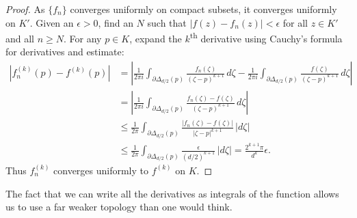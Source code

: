 \documentclass[12pt,openany]{book}
\newcommand{\sabs}[1]{\lvert {#1} \rvert}
\newcommand{\abs}[1]{\left\lvert {#1} \right\rvert}
\theoremstyle{plain}
\theoremstyle{remark}
\theoremstyle{definition}
\theoremstyle{exercise}
\theoremstyle{example}
\begin{document}
\begin{proof}
As $\{ f_n \}$ converges uniformly on compact subsets, it converges uniformly
on $K'$.  Given an $\epsilon > 0$, find an $N$ such that 
$\sabs{f(z)-f_n(z)} < \epsilon$ for all $z \in K'$ and
all $n \geq N$.
For any $p \in K$, expand the $k$\textsuperscript{th} derivative
using Cauchy's formula for derivatives and estimate:
\begin{equation*}
\begin{split}
\abs{
f_n^{(k)}(p)
-
f^{(k)}(p)
}
& =
\abs{
\frac{1}{2\pi i}
\int_{\partial \Delta_{d/2}(p)}
\frac{f_n(\zeta)}{{(\zeta-p)}^{k+1}} \, d\zeta 
-
\frac{1}{2\pi i}
\int_{\partial \Delta_{d/2}(p)}
\frac{f(\zeta)}{{(\zeta-p)}^{k+1}} \, d\zeta 
}
\\
& =
\abs{
\frac{1}{2\pi i}
\int_{\partial \Delta_{d/2}(p)}
\frac{f_n(\zeta)-f(\zeta)}{{(\zeta-p)}^{k+1}} \, d\zeta 
}
\\
& \leq
\frac{1}{2\pi}
\int_{\partial \Delta_{d/2}(p)}
\frac{\sabs{f_n(\zeta)-f(\zeta)}}{{\sabs{\zeta-p}}^{k+1}} \, \sabs{d\zeta}
\\
&
\leq
\frac{1}{2\pi}
\int_{\partial \Delta_{d/2}(p)}
\frac{\epsilon}{{(d/2)}^{k+1}} \, \sabs{d\zeta}
=
\frac{2^{k+1}\pi}{d^k} 
\epsilon .
\end{split}
\end{equation*}
Thus $f_n^{(k)}$ converges uniformly to $f^{(k)}$ on $K$.
\end{proof}

The fact that we can write all the derivatives as
integrals of the function
allows us to use a far weaker topology than one would think.
\end{document}
